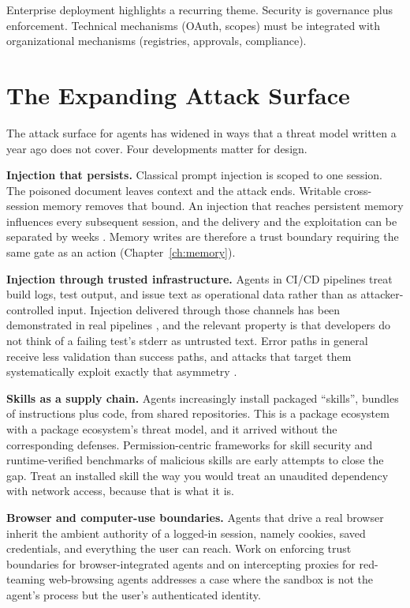 Enterprise deployment highlights a recurring theme. Security is governance plus enforcement. Technical mechanisms (OAuth, scopes) must be integrated with organizational mechanisms (registries, approvals, compliance).

\section{The Expanding Attack Surface}

The attack surface for agents has widened in ways that a threat model written a
year ago does not cover. Four developments matter for design.

\textbf{Injection that persists.} Classical prompt injection is scoped to one
session. The poisoned document leaves context and the attack ends. Writable
cross-session memory removes that bound. An injection that reaches persistent
memory influences every subsequent session, and the delivery and the exploitation
can be separated by weeks \cite{crosssession2026, memsec2026}. Memory writes are
therefore a trust boundary requiring the same gate as an action
(Chapter~\ref{ch:memory}).

\textbf{Injection through trusted infrastructure.} Agents in CI/CD pipelines treat
build logs, test output, and issue text as operational data rather than as
attacker-controlled input. Injection delivered through those channels has been
demonstrated in real pipelines \cite{gitinject2026}, and the relevant property is
that developers do not think of a failing test's stderr as untrusted text.
Error paths in general receive less validation than success paths, and attacks that
target them systematically exploit exactly that asymmetry \cite{vats2026}.

\textbf{Skills as a supply chain.} Agents increasingly install packaged
``skills'', bundles of instructions plus code, from shared repositories.
This is a package ecosystem with a package ecosystem's threat model, and it
arrived without the corresponding defenses. Permission-centric frameworks for
skill security \cite{skillguard2026} and runtime-verified benchmarks of malicious
skills \cite{malskill2026} are early attempts to close the gap. Treat an installed
skill the way you would treat an unaudited dependency with network access,
because that is what it is.

\textbf{Browser and computer-use boundaries.} Agents that drive a real browser
inherit the ambient authority of a logged-in session, namely cookies, saved credentials,
and everything the user can reach. Work on enforcing trust boundaries for
browser-integrated agents \cite{webmcp2026} and on intercepting proxies for red-teaming
web-browsing agents \cite{ipiproxy2026} addresses a case where the sandbox is not the
agent's process but the user's authenticated identity.

